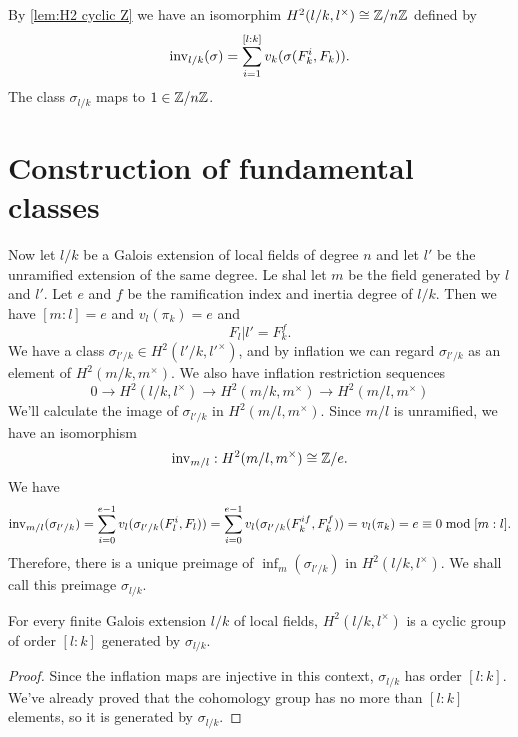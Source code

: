 By \ref{lem:H2 cyclic Z} we have an isomorphim $H^2(l/k, l^\times) \cong {\mathbb Z} / n {\mathbb Z}$ defined by
\[
	\mathrm{inv}_{l/k}(\sigma) = \sum_{i=1}^{[l:k]} v_k(\sigma(F_k^i, F_k)).
\]
The class $\sigma_{l/k}$ maps to $1 \in {\mathbb Z}/n{\mathbb Z}$.







\section{Construction of fundamental classes}

Now let $l/k$ be a Galois extension of local fields of degree $n$ and let $l'$ be
the unramified extension of the same degree. Le shal let $m$ be the field generated by $l$ and $l'$.
Let $e$ and $f$ be the ramification index and inertia degree of $l/k$.
Then we have $[m:l] = e$ and $v_l(\pi_k)= e$ and
\[
	F_l|l' = F_k^f.
\]
We have a class $\sigma_{l'/k} \in H^2(l'/k,l'^\times)$, and by inflation we can regard
$\sigma_{l'/k}$ as an element of $H^2(m/k,m^\times)$.
We also have inflation restriction sequences
\[
	0 \to H^2(l/k, l^\times) \to H^2(m/k , m^\times) \to H^2(m/l, m^\times)
\]
We'll calculate the image of $\sigma_{l'/k}$ in $H^2(m/l, m^\times)$.
Since $m/l$ is unramified, we have an isomorphism
\[
	\mathrm{inv}_{m/l} : H^2(m/l, m^\times) \cong {\mathbb Z}/ e.
\]
We have
\[
	\mathrm{inv}_{m/l}(\sigma_{l'/k})
	=
	\sum_{i=0}^{e-1} v_l (\sigma_{l'/k}(F_l^i,F_l))
	=
	\sum_{i=0}^{e-1} v_l (\sigma_{l'/k}(F_k^{if},F_k^f))
	=
	v_l (\pi_k)
	= e
	\equiv 0 \bmod [m:l].
\]
Therefore, there is a unique preimage of $\inf_m(\sigma_{l'/k})$ in $H^2(l/k,l^\times)$.
We shall call this preimage $\sigma_{l/k}$.

\begin{theorem} \label{H2 local cyclic}
	For every finite Galois extension $l/k$ of local fields,
	$H^2(l/k,l^\times)$ is a cyclic group of order $[l:k]$ generated by $\sigma_{l/k}$.
\end{theorem}

\begin{proof}
	Since the inflation maps are injective in this context, $\sigma_{l/k}$ has order $[l:k]$.
	We've already proved that the cohomology group has no more than $[l:k]$ elements, so
	it is generated by $\sigma_{l/k}$.
\end{proof}
